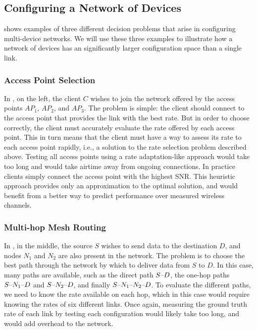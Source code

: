 \subsection{Configuring a Network of Devices}
\label{sec:intro_network_problems}
 shows examples of three different decision problems that arise in configuring multi-device networks. We will use these three examples to illustrate how a network of devices has an significantly larger configuration space than a single link.

\subsubsection{Access Point Selection}
In , on the left, the client $C$ wishes to join the network offered by the access points $AP_1$, $AP_2$, and $AP_3$. The  problem is simple: the client should connect to the access point that provides the link with the best rate. But in order to choose correctly, the client must accurately evaluate the rate offered by each access point. This in turn means that the client must have a way to assess its rate to each access point rapidly, i.e., a solution to the rate selection problem described above. Testing all access points using a rate adaptation-like approach would take too long and would take airtime away from ongoing connections. In practice clients simply connect the access point with the highest SNR\@. This heuristic approach provides only an approximation to the optimal solution, and would benefit from a better way to predict performance over measured wireless channels.

\subsubsection{Multi-hop Mesh Routing}
In , in the middle, the source $S$ wishes to send data to the destination $D$, and nodes $N_1$ and $N_2$ are also present in the network. The  problem is to choose the best path through the network by which to deliver data from $S$ to $D$. In this case, many paths are available, such as the direct path $S\textnormal{--} D$, the one-hop paths $S\textnormal{--} N_1\textnormal{--} D$ and $S\textnormal{--} N_2\textnormal{--} D$, and finally $S\textnormal{--} N_1\textnormal{--} N_2\textnormal{--} D$. To evaluate the different paths, we need to know the rate available on each hop, which in this case would require knowing the rates of six different links. Once again, measuring the ground truth rate of each link by testing each configuration would likely take too long, and would add overhead to the network.

